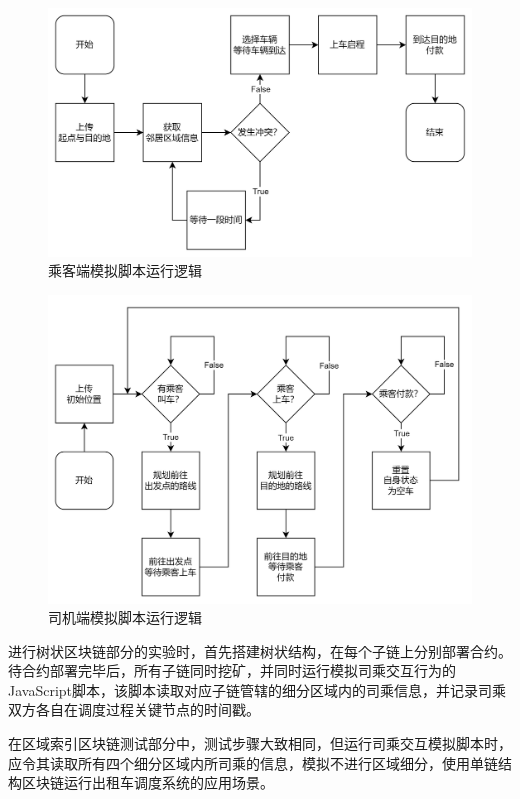 \begin{figure}[htbp]
    \centering
    \includegraphics[width=\textwidth]{images/passenger示意图.png}
    \caption{乘客端模拟脚本运行逻辑}\label{乘客端模拟脚本运行逻辑} %
\end{figure}

\begin{figure}[htbp]
    \centering
    \includegraphics[width=\textwidth]{images/vehicle示意图.png}
    \caption{司机端模拟脚本运行逻辑}\label{司机端模拟脚本运行逻辑} %
\end{figure}

进行树状区块链部分的实验时，首先搭建树状结构，在每个子链上分别部署合约。待合约部署完毕后，所有子链同时挖矿，并同时运行模拟司乘交互行为的JavaScript脚本，该脚本读取对应子链管辖的细分区域内的司乘信息，并记录司乘双方各自在调度过程关键节点的时间戳。

在区域索引区块链测试部分中，测试步骤大致相同，但运行司乘交互模拟脚本时，应令其读取所有四个细分区域内所司乘的信息，模拟不进行区域细分，使用单链结构区块链运行出租车调度系统的应用场景。

